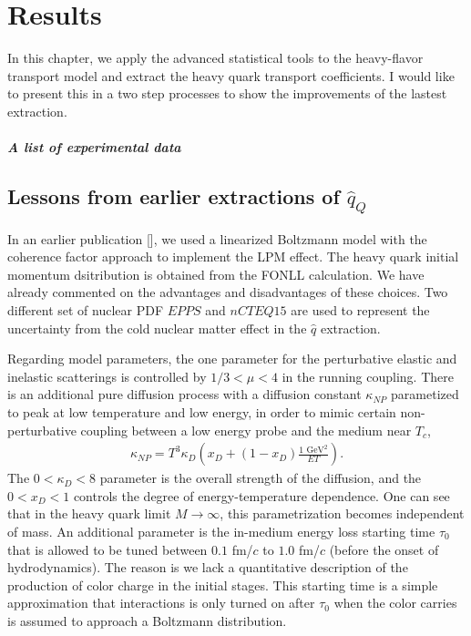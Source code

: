 \chapter{Results}
\label{chapter:results}
In this chapter, we apply the advanced statistical tools to the heavy-flavor transport model and extract the heavy quark transport coefficients.
I would like to present this in a two step processes to show the improvements of the lastest extraction.



\paragraph{A list of experimental data}
\section{Lessons from earlier extractions of $\hat{q}_Q$}
In an earlier publication [], we used a linearized Boltzmann model with the coherence factor approach to implement the LPM effect.
The heavy quark initial momentum dsitribution is obtained from the FONLL calculation.
We have already commented on the advantages and disadvantages of these choices.
Two different set of nuclear PDF $EPPS$ and $nCTEQ15$ are used to represent the uncertainty from the cold nuclear matter effect in the $\hat{q}$ extraction.

Regarding model parameters, the one parameter for the perturbative elastic and inelastic scatterings is controlled by $1/3 < \mu < 4$ in the running coupling. 
There is an additional pure diffusion process with a diffusion constant $\kappa_{NP}$ parametized to peak at low temperature and low energy, in order to mimic certain non-perturbative coupling between a low energy probe and the medium near $T_c$,
\begin{eqnarray}
\kappa_{NP} = T^3 \kappa_D \left(x_D + (1-x_D)\frac{1\textrm{ GeV}{}^2}{ET}\right).
\end{eqnarray}
The $0<\kappa_D<8$ parameter is the overall strength of the diffusion, and the $0<x_D<1$ controls the degree of energy-temperature dependence.
One can see that in the heavy quark limit $M\rightarrow \infty$, this parametrization becomes independent of mass.
An additional parameter is the in-medium energy loss starting time $\tau_0$ that is allowed to be tuned between $0.1$ fm/$c$ to $1.0$ fm/$c$ (before the onset of hydrodynamics).
The reason is we lack a quantitative description of the production of color charge in the initial stages.
This starting time is a simple approximation that interactions is only turned on after $\tau_0$ when the color carries is assumed to approach a Boltzmann distribution.


